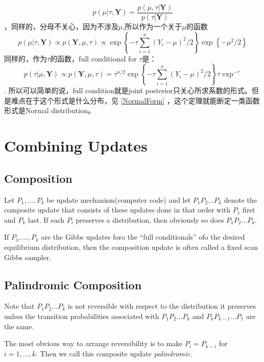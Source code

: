 \documentclass[
]{book}
\theoremstyle{definition}
\theoremstyle{definition}
\theoremstyle{definition}
\theoremstyle{remark}
\begin{document}
\[
p(\mu | \tau, \mathbf{Y})=\frac{p(\mu, \tau | \mathbf{Y})}{p(\tau | \mathbf{Y})}
\]
，同样的，分母不关心，因为不涉及\(\mu\),所以作为一个关于\(\mu\)的函数
\[
p(\mu | \tau, \mathbf{Y}) \propto p(\mathbf{Y}, \mu, \tau) \propto \exp \left\{-\tau \sum_{i=1}^{n}\left(Y_{i}-\mu\right)^{2} / 2\right\} \exp \left\{-\mu^{2} / 2\right\}
\]
同样的，作为\(\tau\)的函数，full conditional for \(\tau\)是：
\[
p(\tau | \mu, \mathbf{Y}) \propto p(\mathbf{Y}, \mu, \tau)=\tau^{n / 2} \exp \left\{-\tau \sum_{i=1}^{n}\left(Y_{i}-\mu\right)^{2} / 2\right\} \tau \exp ^{-\tau}
\]
.
所以可以简单的说，full condition就是joint posterior只关心所求系数的形式。但是难点在于这个形式是什么分布，见 \ref{NormalForm}
，这个定理就能断定一类函数形式是Normal distribution。

\hypertarget{combining-updates}{%
\section{Combining Updates}\label{combining-updates}}

\hypertarget{composition}{%
\subsection{Composition}\label{composition}}

Let \(P_1,...,P_k\) be update mechanism(computer code) and let \(P_1P_2...P_k\) denote the composite update that consists of these updates done in that order with \(P_1\) first and \(P_k\) last. If each \(P_i\) preserves a distribution, then obviously so does \(P_1P_2...P_k\).

If \(P_1,...,P_k\) are the Gibbs updates foro the ``full conditionals'' ofo the desired equilibrium distribution, then the composition update is often called a fixed scan Gibbs sampler.

\hypertarget{palindromic-composition}{%
\subsection{Palindromic Composition}\label{palindromic-composition}}

Note that \(P_1P_2...P_k\) is not reversible with respect to the distribution it preserves unless the transition probabilities associated with \(P_1P_2...P_k\) and \(P_kP_{k-1}...P_1\) are the same.

The most obvious way to arrange reversibility is to make \(P_i=P_{k-i}\) for \(i=1,...,k\). Then we call this composite update \emph{palindromic}.
\end{document}

